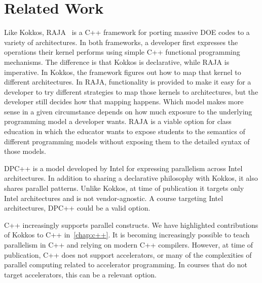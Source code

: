 \section{Related Work}\label{chap:related}
Like Kokkos, RAJA~\cite{RAJA} is a C++ framework for porting massive DOE codes to a variety of architectures. In both frameworks, a developer first expresses the operations their kernel performs using simple C++ functional programming mechanisms. The difference is that Kokkos is declarative, while RAJA is imperative. In Kokkos, the framework figures out how to map that kernel to different architectures. In RAJA, functionality is provided to make it easy for a developer to try different strategies to map those kernels to architectures, but the developer still decides how that mapping happens. Which model makes more sense in a given circumstance depends on how much exposure to the underlying programming model a developer wants. RAJA is a viable option for class education in which the educator wants to expose students to the semantics of different programming models without exposing them to the detailed syntax of those models.

DPC++\cite{DPCPP} is a model developed by Intel\textsuperscript{\textregistered} for expressing parallelism across Intel architectures. In addition to sharing a declarative philosophy with Kokkos, it also shares parallel patterns. Unlike Kokkos, at time of publication it targets only Intel architectures and is not vendor-agnostic. A course targeting Intel architectures, DPC++ could be a valid option.

C++ increasingly supports parallel constructs\cite{CPP}. We have highlighted contributions of Kokkos to C++ in~\ref{chap:c++}. It is becoming increasingly possible to teach parallelism in C++ and relying on modern C++ compilers. However, at time of publication, C++ does not support accelerators, or many of the complexities of parallel computing related to accelerator programming. In courses that do not target accelerators, this can be a relevant option.
